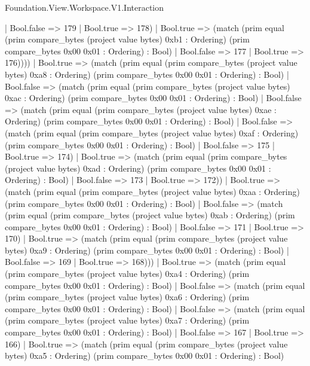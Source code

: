 \begin{lexlean}{Foundation.View.Workspace.V1.Interaction}
\begin{semanticmodule}
{                    | Bool.false => 179
                    | Bool.true => 178)
                  | Bool.true => (match (prim equal (prim compare_bytes (project value bytes) 0xb1 : Ordering) (prim compare_bytes 0x00 0x01 : Ordering) : Bool)
                    | Bool.false => 177
                    | Bool.true => 176))))
            | Bool.true => (match (prim equal (prim compare_bytes (project value bytes) 0xa8 : Ordering) (prim compare_bytes 0x00 0x01 : Ordering) : Bool)
              | Bool.false => (match (prim equal (prim compare_bytes (project value bytes) 0xac : Ordering) (prim compare_bytes 0x00 0x01 : Ordering) : Bool)
                | Bool.false => (match (prim equal (prim compare_bytes (project value bytes) 0xae : Ordering) (prim compare_bytes 0x00 0x01 : Ordering) : Bool)
                  | Bool.false => (match (prim equal (prim compare_bytes (project value bytes) 0xaf : Ordering) (prim compare_bytes 0x00 0x01 : Ordering) : Bool)
                    | Bool.false => 175
                    | Bool.true => 174)
                  | Bool.true => (match (prim equal (prim compare_bytes (project value bytes) 0xad : Ordering) (prim compare_bytes 0x00 0x01 : Ordering) : Bool)
                    | Bool.false => 173
                    | Bool.true => 172))
                | Bool.true => (match (prim equal (prim compare_bytes (project value bytes) 0xaa : Ordering) (prim compare_bytes 0x00 0x01 : Ordering) : Bool)
                  | Bool.false => (match (prim equal (prim compare_bytes (project value bytes) 0xab : Ordering) (prim compare_bytes 0x00 0x01 : Ordering) : Bool)
                    | Bool.false => 171
                    | Bool.true => 170)
                  | Bool.true => (match (prim equal (prim compare_bytes (project value bytes) 0xa9 : Ordering) (prim compare_bytes 0x00 0x01 : Ordering) : Bool)
                    | Bool.false => 169
                    | Bool.true => 168)))
              | Bool.true => (match (prim equal (prim compare_bytes (project value bytes) 0xa4 : Ordering) (prim compare_bytes 0x00 0x01 : Ordering) : Bool)
                | Bool.false => (match (prim equal (prim compare_bytes (project value bytes) 0xa6 : Ordering) (prim compare_bytes 0x00 0x01 : Ordering) : Bool)
                  | Bool.false => (match (prim equal (prim compare_bytes (project value bytes) 0xa7 : Ordering) (prim compare_bytes 0x00 0x01 : Ordering) : Bool)
                    | Bool.false => 167
                    | Bool.true => 166)
                  | Bool.true => (match (prim equal (prim compare_bytes (project value bytes) 0xa5 : Ordering) (prim compare_bytes 0x00 0x01 : Ordering) : Bool)
}
\end{semanticmodule}
\end{lexlean}
